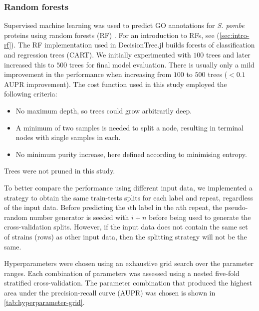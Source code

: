 \subsubsection{Random forests}

Supervised machine learning was used to predict GO annotations for \emph{S. pombe} proteins using random forests (RF) \cite{Murphy2012}. For an introduction to RFs, see (\ref{sec:intro-rf}). The RF implementation used in DecisionTree.jl builds forests of classification and regression trees (CART). We initially experimented with $100$ trees and later increased this to $500$ trees for final model evaluation. There is usually only a mild improvement in the performance when increasing from $100$ to $500$ trees ($<0.1$ AUPR improvement). The cost function used in this study employed the following criteria:

\begin{itemize}
    \item No maximum depth, so trees could grow arbitrarily deep.
    \item A minimum of two samples is needed to split a node, resulting in terminal nodes with single samples in each.
    \item No minimum purity increase, here defined according to minimising entropy.
\end{itemize}

Trees were not pruned in this study.

To better compare the performance using different input data, we implemented a strategy to obtain the same train-tests splits for each label and repeat, regardless of the input data. Before predicting the $i$th label in the $n$th repeat, the pseudo-random number generator is seeded with $i+n$ before being used to generate the cross-validation splits. However, if the input data does not contain the same set of strains (rows) as other input data, then the splitting strategy will not be the same.

Hyperparameters were chosen using an exhaustive grid search over the parameter ranges. Each combination of parameters was assessed using a nested five-fold stratified cross-validation. The parameter combination that produced the highest area under the precision-recall curve (AUPR) was chosen is shown in \ref{tab:hyperparameter-grid}.

